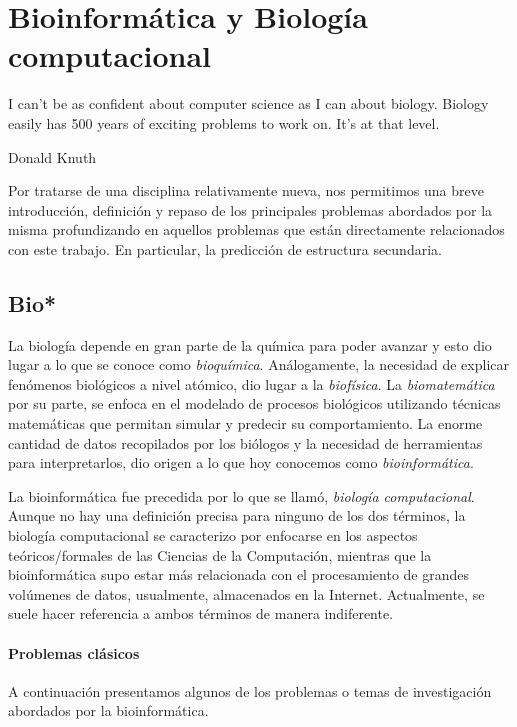 \chapter{Bioinform\'atica y Biolog\'ia computacional}
\label{bioinformatica}
\epigraph{I can't be as confident about computer science as I can about biology.
Biology easily has 500 years of exciting problems to work on. It's at that
level.}%
{Donald Knuth}

Por tratarse de una disciplina relativamente nueva, nos permitimos una breve
introducci\'on, definici\'on y repaso de los principales problemas abordados
por la misma profundizando en aquellos problemas que est\'an directamente
relacionados con este trabajo. En particular, la predicci\'on de estructura
secundaria.

\section{Bio*}

La biolog\'ia depende en gran parte de la qu\'imica para poder avanzar y esto
dio lugar a lo que se conoce como \textit{bioqu\'imica}. An\'alogamente, la
necesidad de explicar fen\'omenos biol\'ogicos a nivel at\'omico, dio lugar a la
\textit{biof\'isica}. La \textit{biomatem\'atica} por su parte, se enfoca en el
modelado de procesos biol\'ogicos utilizando t\'ecnicas matem\'aticas que
permitan simular y predecir su comportamiento. La enorme cantidad de datos
recopilados por los bi\'ologos y la necesidad de herramientas para
interpretarlos, dio origen a lo que hoy conocemos como
\textit{bioinform\'atica}.

La bioinform\'atica fue precedida por lo que se llam\'o, \textit{biolog\'ia
computacional}. Aunque no hay una definici\'on precisa para ninguno de
los dos t\'erminos, la biolog\'ia computacional se caracterizo por enfocarse
en los aspectos te\'oricos/formales de las Ciencias de la Computaci\'on,
mientras que la bioinform\'atica supo estar m\'as relacionada con el
procesamiento de grandes vol\'umenes de datos, usualmente, almacenados en la
Internet. Actualmente, se suele hacer referencia a ambos t\'erminos de manera
indiferente.

\subsubsection{Problemas cl\'asicos}

A continuaci\'on presentamos algunos de los problemas o temas de investigaci\'on
abordados por la bioinform\'atica.

